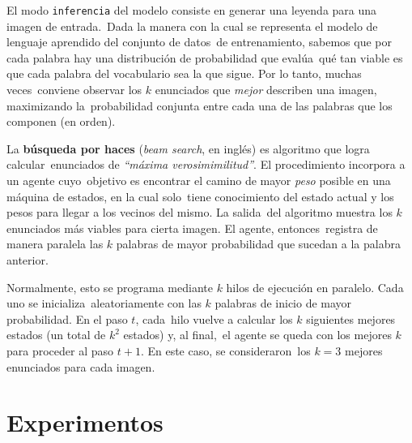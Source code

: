 \noindent
El modo \verb+inferencia+ del modelo consiste en generar una leyenda para una imagen de entrada.\
Dada la manera con la cual se representa el modelo de lenguaje aprendido del conjunto de datos\
de entrenamiento, sabemos que por cada palabra hay una distribución de probabilidad que evalúa\
qué tan viable es que cada palabra del vocabulario sea la que sigue. Por lo tanto, muchas veces\
conviene observar los $k$ enunciados que \emph{mejor} describen una imagen, maximizando la\
probabilidad conjunta entre cada una de las palabras que los componen (en orden).\par
La \textbf{búsqueda por haces} (\emph{beam search}, en inglés) es algoritmo que logra calcular\
enunciados de \emph{``máxima verosimimilitud''}. El procedimiento incorpora a un agente cuyo\
objetivo es encontrar el camino de mayor \emph{peso} posible en una máquina de estados, en la cual solo\
tiene conocimiento del estado actual y los pesos para llegar a los vecinos del mismo. La salida\
del algoritmo muestra los $k$ enunciados más viables para cierta imagen. El agente, entonces\
registra de manera paralela las $k$ palabras de mayor probabilidad que sucedan a la palabra anterior.\par
Normalmente, esto se programa mediante $k$ hilos de ejecución en paralelo. Cada uno se inicializa\
aleatoriamente con las $k$ palabras de inicio de mayor probabilidad. En el paso $t$, cada\
hilo vuelve a calcular los $k$ siguientes mejores estados (un total de $k^2$ estados) y, al final,\
el agente se queda con los mejores $k$ para proceder al paso $t+1$. En este caso, se consideraron\
los $k=3$ mejores enunciados para cada imagen.

\section{Experimentos}

